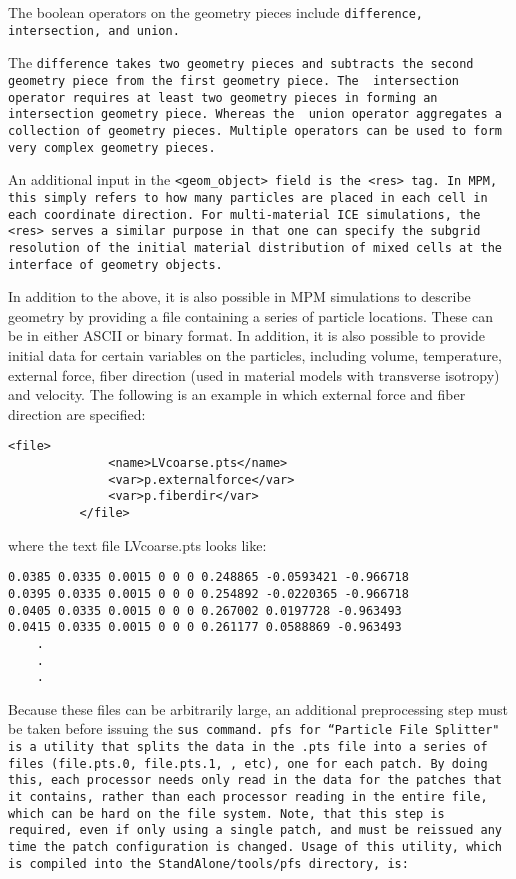 The boolean operators on the geometry pieces include \tt difference,
intersection, \normalfont and \tt union.\normalfont

The \tt difference \normalfont takes two geometry pieces and subtracts
the second geometry piece from the first geometry piece.  The \tt
intersection \normalfont operator requires at least two geometry
pieces in forming an intersection geometry piece.  Whereas the \tt
union \normalfont operator aggregates a collection of geometry pieces.
Multiple operators can be used to form very complex geometry pieces.

An additional input in the \tt <geom\_object> \normalfont field is the
\tt <res> \normalfont tag.  In MPM, this simply refers to how many particles
are placed in each cell in each coordinate direction.  For multi-material ICE
simulations, the \tt <res> \normalfont serves a similar purpose in that one
can specify the subgrid resolution of the initial material distribution
of mixed cells at the interface of geometry objects.

In addition to the above, it is also possible in MPM simulations to describe
geometry by providing a file containing a series of particle locations.  These
can be in either ASCII or binary format.  In addition, it is also possible to
provide initial data for certain variables on the particles, including
volume, temperature, external force, fiber direction (used in material models
with transverse isotropy) and velocity.  The following is an example in which
external force and fiber direction are specified:

\begin{Verbatim}[fontsize=\footnotesize]
          <file>
              <name>LVcoarse.pts</name>
              <var>p.externalforce</var>
              <var>p.fiberdir</var>
          </file>
\end{Verbatim}

where the text file LVcoarse.pts looks like:

\begin{Verbatim}[fontsize=\footnotesize]
0.0385 0.0335 0.0015 0 0 0 0.248865 -0.0593421 -0.966718
0.0395 0.0335 0.0015 0 0 0 0.254892 -0.0220365 -0.966718
0.0405 0.0335 0.0015 0 0 0 0.267002 0.0197728 -0.963493
0.0415 0.0335 0.0015 0 0 0 0.261177 0.0588869 -0.963493
	.
	.
	.
\end{Verbatim}
Because these files can be arbitrarily large, an additional preprocessing step
must be taken before issuing the \tt sus \normalfont command.
\tt pfs \normalfont for ``Particle File Splitter" is a utility that splits the
data in the \tt .pts \normalfont file into a series of files
(\tt file.pts.0, file.pts.1, \normalfont, etc), one for each
patch.  By doing this, each processor needs only read in the data for the
patches that it contains, rather than each processor reading in the entire file,
which can be hard on the file system.  Note, that this step is required,
even if only using a single patch, and must be reissued any time the patch
configuration is changed.  Usage of this utility, which is compiled
into the \tt StandAlone/tools/pfs \normalfont directory, is:

